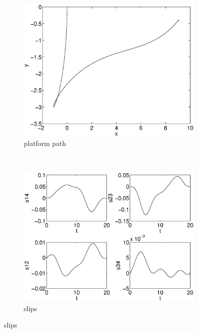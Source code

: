 \begin{figure}[h]
\begin{subfigure}[b]{0.45\textwidth}
\centering
\includegraphics[width=\textwidth]{img/manip_task_path.eps}
\caption{platform path}
\end{subfigure}
~
\begin{subfigure}[b]{0.45\textwidth}
\centering
\includegraphics[width=\textwidth]{img/manip_task_slips.eps}
\caption{slips}
\end{subfigure}


\end{figure}
